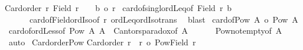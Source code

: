\begin{isabellebody}
{\isachardoublequoteopen}{\isasymlbrakk}Card{\isacharunderscore}{\kern0pt}order\ r{\isacharsemicolon}{\kern0pt}\ Field\ r\ {\isasymnoteq}\ {\isacharbraceleft}{\kern0pt}{\isacharbraceright}{\kern0pt}{\isasymrbrakk}\ {\isasymLongrightarrow}\ {\isacharbar}{\kern0pt}{\isacharbraceleft}{\kern0pt}b{\isacharbraceright}{\kern0pt}{\isacharbar}{\kern0pt}\ {\isasymle}o\ r{\isachardoublequoteclose}\isanewline
%
\isadelimproof
%
\endisadelimproof
%
\isatagproof
{}\isamarkupfalse%
\ card{\isacharunderscore}{\kern0pt}of{\isacharunderscore}{\kern0pt}singl{\isacharunderscore}{\kern0pt}ordLeq{\isacharbrackleft}{\kern0pt}of\ {\isachardoublequoteopen}Field\ r{\isachardoublequoteclose}\ b{\isacharbrackright}{\kern0pt}\isanewline
\ \ \ \ \ \ card{\isacharunderscore}{\kern0pt}of{\isacharunderscore}{\kern0pt}Field{\isacharunderscore}{\kern0pt}ordIso{\isacharbrackleft}{\kern0pt}of\ r{\isacharbrackright}{\kern0pt}\ ordLeq{\isacharunderscore}{\kern0pt}ordIso{\isacharunderscore}{\kern0pt}trans\ \isamarkupfalse%
\ blast%
\endisatagproof
{\isafoldproof}%
%
\isadelimproof
\isanewline
%
\endisadelimproof
\isanewline
{}\isamarkupfalse%
\ card{\isacharunderscore}{\kern0pt}of{\isacharunderscore}{\kern0pt}Pow{\isacharcolon}{\kern0pt}\ {\isachardoublequoteopen}{\isacharbar}{\kern0pt}A{\isacharbar}{\kern0pt}\ {\isacharless}{\kern0pt}o\ {\isacharbar}{\kern0pt}Pow\ A{\isacharbar}{\kern0pt}{\isachardoublequoteclose}\isanewline
%
\isadelimproof
%
\endisadelimproof
%
\isatagproof
{}\isamarkupfalse%
\ card{\isacharunderscore}{\kern0pt}of{\isacharunderscore}{\kern0pt}ordLess{}{\isacharbrackleft}{\kern0pt}of\ {\isachardoublequoteopen}Pow\ A{\isachardoublequoteclose}\ A{\isacharbrackright}{\kern0pt}\ \ Cantors{\isacharunderscore}{\kern0pt}paradox{\isacharbrackleft}{\kern0pt}of\ A{\isacharbrackright}{\kern0pt}\isanewline
\ \ \ \ \ \ Pow{\isacharunderscore}{\kern0pt}not{\isacharunderscore}{\kern0pt}empty{\isacharbrackleft}{\kern0pt}of\ A{\isacharbrackright}{\kern0pt}\ \isamarkupfalse%
\ auto%
\endisatagproof
{\isafoldproof}%
%
\isadelimproof
\isanewline
%
\endisadelimproof
\isanewline
{}\isamarkupfalse%
\ Card{\isacharunderscore}{\kern0pt}order{\isacharunderscore}{\kern0pt}Pow{\isacharcolon}{\kern0pt}\isanewline
{\isachardoublequoteopen}Card{\isacharunderscore}{\kern0pt}order\ r\ {\isasymLongrightarrow}\ r\ {\isacharless}{\kern0pt}o\ {\isacharbar}{\kern0pt}Pow{\isacharparenleft}{\kern0pt}Field\ r{\isacharparenright}{\kern0pt}{\isacharbar}{\kern0pt}{\isachardoublequoteclose}\isanewline
%
\isadelimproof

\end{isabellebody}
